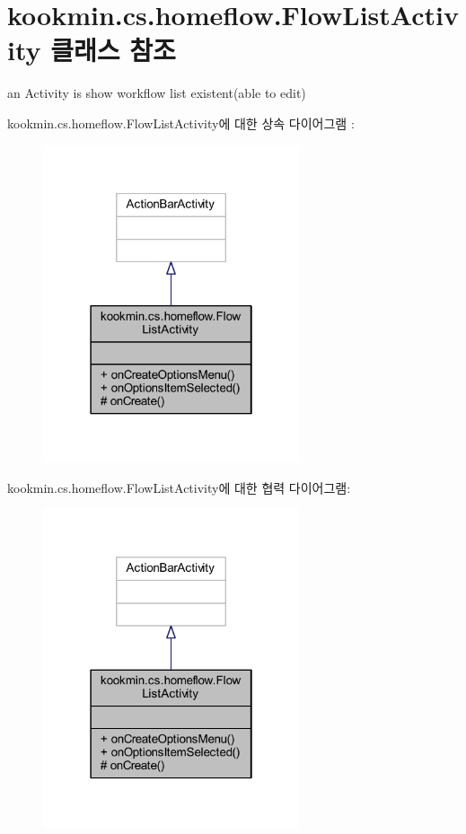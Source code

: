 \hypertarget{classkookmin_1_1cs_1_1homeflow_1_1_flow_list_activity}{}\section{kookmin.\+cs.\+homeflow.\+Flow\+List\+Activity 클래스 참조}
\label{classkookmin_1_1cs_1_1homeflow_1_1_flow_list_activity}


an Activity is show workflow list existent(able to edit)  




kookmin.\+cs.\+homeflow.\+Flow\+List\+Activity에 대한 상속 다이어그램 \+: \nopagebreak
\begin{figure}[H]
\begin{center}
\leavevmode
\includegraphics[width=214pt]{classkookmin_1_1cs_1_1homeflow_1_1_flow_list_activity__inherit__graph}
\end{center}
\end{figure}


kookmin.\+cs.\+homeflow.\+Flow\+List\+Activity에 대한 협력 다이어그램\+:\nopagebreak
\begin{figure}[H]
\begin{center}
\leavevmode
\includegraphics[width=214pt]{classkookmin_1_1cs_1_1homeflow_1_1_flow_list_activity__coll__graph}
\end{center}
\end{figure}
